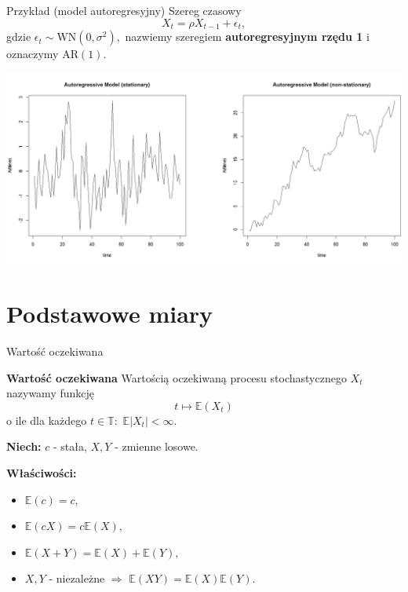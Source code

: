 \documentclass[a4paper, 11pt]{beamer}
\begin{document}
	\begin{frame}{Przykład (model autoregresyjny)}
		Szereg czasowy \[
			X_t = \rho X_{t-1} + \epsilon_t,
		\] gdzie $\epsilon_t \sim \mbox{WN}\left(0, \sigma^2\right),$ nazwiemy szeregiem \textbf{autoregresyjnym rzędu 1} i oznaczymy $\mbox{AR}\left(1\right).$
		
		\begin{center}
			\includegraphics[scale=0.25]{./gfx/ar_1}
		\end{center}
	\end{frame}

	\section{Podstawowe miary}

	\begin{frame}{Wartość oczekiwana}
		\begin{block}{\textbf{Wartość oczekiwana}}
			Wartością oczekiwaną procesu stochastycznego $X_t$ nazywamy funkcję \[
				t \mapsto \mathbb{E}\left(X_t\right)
			\]
			o ile dla każdego $t\in\mathbb{T}:$ $\mathbb{E}\left|X_t\right| < \infty.$
		\end{block}
		
		\textbf{Niech:} $c$ - stała, $X,Y$ - zmienne losowe.
		
		\textbf{Właściwości:}
		\begin{itemize}
			\item $\mathbb{E}\left(c\right) = c,$
			\item $\mathbb{E}\left(cX\right) = c\mathbb{E}\left(X\right),$
			\item $\mathbb{E}\left(X+Y\right) = \mathbb{E}\left(X\right) + \mathbb{E}\left(Y\right),$
			\item $X,Y$ - niezależne $\Rightarrow$ $\mathbb{E}\left(XY\right) = \mathbb{E}\left(X\right) \mathbb{E}\left(Y\right).$
		\end{itemize}
	\end{frame}
	
\end{document}
